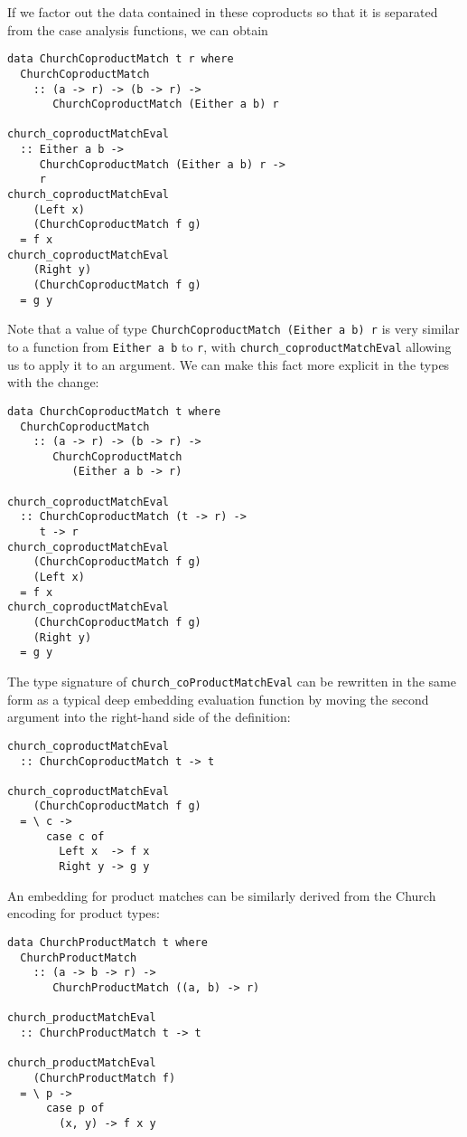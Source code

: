 \documentclass[sigplan,anonymous,review]{acmart}
\newcommand{\ttt}{\texttt}
\begin{document}
If we factor out the data contained in these coproducts so that it is separated from the
case analysis functions, we can obtain

\begin{lstlisting}
data ChurchCoproductMatch t r where
  ChurchCoproductMatch
    :: (a -> r) -> (b -> r) ->
       ChurchCoproductMatch (Either a b) r

church_coproductMatchEval
  :: Either a b ->
     ChurchCoproductMatch (Either a b) r ->
     r
church_coproductMatchEval
    (Left x)
    (ChurchCoproductMatch f g)
  = f x
church_coproductMatchEval
    (Right y)
    (ChurchCoproductMatch f g)
  = g y
\end{lstlisting}


Note that a value of type \ttt{ChurchCoproductMatch (Either a b) r} is very similar to
a function from \ttt{Either a b} to \ttt{r}, with \ttt{church\_coproductMatchEval} allowing
us to apply it to an argument. We can make this fact more explicit in the types with the
change:

\begin{lstlisting}
data ChurchCoproductMatch t where
  ChurchCoproductMatch
    :: (a -> r) -> (b -> r) ->
       ChurchCoproductMatch
          (Either a b -> r)

church_coproductMatchEval
  :: ChurchCoproductMatch (t -> r) ->
     t -> r
church_coproductMatchEval
    (ChurchCoproductMatch f g)
    (Left x)
  = f x
church_coproductMatchEval
    (ChurchCoproductMatch f g)
    (Right y)
  = g y
\end{lstlisting}

The type signature of \ttt{church\_coProductMatchEval} can be rewritten in the same form as a
typical deep embedding evaluation function by moving the second argument into the right-hand
side of the definition:

\begin{lstlisting}
church_coproductMatchEval
  :: ChurchCoproductMatch t -> t

church_coproductMatchEval
    (ChurchCoproductMatch f g)
  = \ c ->
      case c of
        Left x  -> f x
        Right y -> g y
\end{lstlisting}

An embedding for product matches can be similarly derived from the Church encoding for product
types:

\begin{lstlisting}
data ChurchProductMatch t where
  ChurchProductMatch
    :: (a -> b -> r) ->
       ChurchProductMatch ((a, b) -> r)

church_productMatchEval
  :: ChurchProductMatch t -> t

church_productMatchEval
    (ChurchProductMatch f)
  = \ p ->
      case p of
        (x, y) -> f x y
\end{lstlisting}
\end{document}

